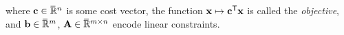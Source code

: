 \documentclass{article}
\newcommand\otodo[2][]{\todo[color=olicolor!30!white,#1]{#2}}
\begin{document}
where $\mathbf{c} \in \mskip1mu\overline{\mskip-1mu\mathbb R\!}\,^{n}$ is some cost vector,
the function $\mathbf{x} \mapsto \mathbf{c}^{\sf T} \mathbf{x}$ is called the \emph{objective},
and $\mathbf{b} \in \mskip1mu\overline{\mskip-1mu\mathbb R\!}\,^m$, $\mathbf{A} \in \mskip1mu\overline{\mskip-1mu\mathbb R\!}\,^{m \times n}$ encode linear constraints.
%
\end{document}
